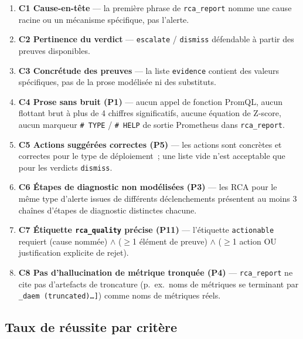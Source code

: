 \documentclass[11pt,a4paper,oneside]{report}
\begin{document}
\begin{enumerate}
  \item \textbf{C1 Cause-en-tête} --- la première phrase de
        \texttt{rca\_report} nomme une cause racine ou un mécanisme
        spécifique, pas l'alerte.
  \item \textbf{C2 Pertinence du verdict} ---
        \texttt{escalate} / \texttt{dismiss} défendable à partir des
        preuves disponibles.
  \item \textbf{C3 Concrétude des preuves} --- la liste
        \texttt{evidence} contient des valeurs spécifiques, pas de
        la prose modélisée ni des substituts.
  \item \textbf{C4 Prose sans bruit (P1)} --- aucun appel de
        fonction PromQL, aucun flottant brut à plus de 4 chiffres
        significatifs, aucune équation de Z-score, aucun marqueur
        \texttt{\# TYPE} / \texttt{\# HELP} de sortie Prometheus
        dans \texttt{rca\_report}.
  \item \textbf{C5 Actions suggérées correctes (P5)} --- les
        actions sont concrètes et correctes pour le type de
        déploiement~; une liste vide n'est acceptable que pour les
        verdicts \texttt{dismiss}.
  \item \textbf{C6 Étapes de diagnostic non modélisées (P3)} ---
        les RCA pour le même type d'alerte issues de différents
        déclenchements présentent au moins 3 chaînes d'étapes de
        diagnostic distinctes chacune.
  \item \textbf{C7 Étiquette \texttt{rca\_quality} précise (P11)}
        --- l'étiquette \texttt{actionable} requiert (cause nommée)
        $\land$ ($\geq$1 élément de preuve) $\land$ ($\geq$1 action
        OU justification explicite de rejet).
  \item \textbf{C8 Pas d'hallucination de métrique tronquée (P4)}
        --- \texttt{rca\_report} ne cite pas d'artefacts de
        troncature (p.~ex.\ noms de métriques se terminant par
        \texttt{\_daem (truncated)\ldots]}) comme noms de métriques
        réels.
\end{enumerate}

\subsection{Taux de réussite par critère}
\end{document}
